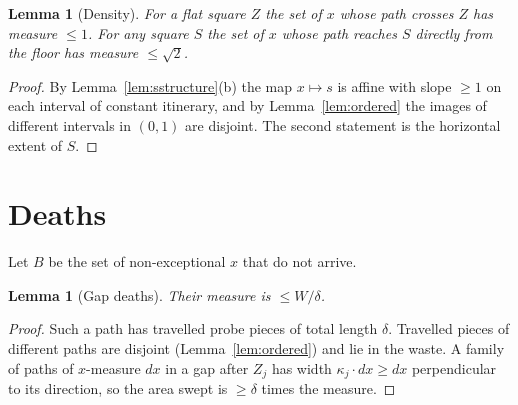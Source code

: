 \documentclass[11pt,letterpaper]{amsart}
\theoremstyle{plain}
\newtheorem{lemma}[theorem]{Lemma}
\theoremstyle{definition}
\theoremstyle{remark}
\begin{document}
\begin{lemma}[Density]\label{lem:density}
For a flat square $Z$ the set of $x$ whose path crosses $Z$ has measure $\le1$. For any square $S$ the set of $x$ whose path reaches $S$ directly from the floor has measure $\le\sqrt2$.
\end{lemma}
\begin{proof}
By Lemma~\ref{lem:sstructure}(b) the map $x\mapsto s$ is affine with slope $\ge1$ on each interval of constant itinerary, and by Lemma~\ref{lem:ordered} the images of different intervals in $(0,1)$ are disjoint. The second statement is the horizontal extent of $S$.
\end{proof}

\section{Deaths}\label{sec:deaths}
Let $B$ be the set of non-exceptional $x$ that do not arrive.

\begin{lemma}[Gap deaths]\label{lem:sgap}
Their measure is $\le W/\delta$.
\end{lemma}
\begin{proof}
Such a path has travelled probe pieces of total length $\delta$. Travelled pieces of different paths are disjoint (Lemma~\ref{lem:ordered}) and lie in the waste. A family of paths of $x$-measure $dx$ in a gap after $Z_j$ has width $\kappa_j\cdot dx\ge dx$ perpendicular to its direction, so the area swept is $\ge\delta$ times the measure.
\end{proof}
\end{document}
